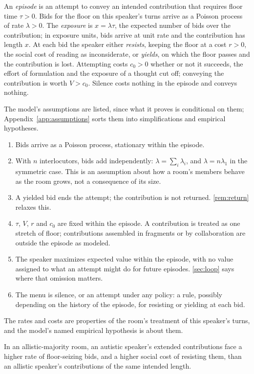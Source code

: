 An \emph{episode} is an attempt to convey an intended contribution that requires floor time $\tau > 0$. Bids for the floor on this speaker's turns arrive as a Poisson process of rate $\lambda > 0$. The \emph{exposure} is $x = \lambda\tau$, the expected number of bids over the contribution; in exposure units, bids arrive at unit rate and the contribution has length $x$. At each bid the speaker either \emph{resists}, keeping the floor at a cost $r > 0$, the social cost of reading as inconsiderate, or \emph{yields}, on which the floor passes and the contribution is lost. Attempting costs $c_0 > 0$ whether or not it succeeds, the effort of formulation and the exposure of a thought cut off; conveying the contribution is worth $V > c_0$. Silence costs nothing in the episode and conveys nothing.

The model's assumptions are listed, since what it proves is conditional on them; Appendix~\ref{app:assumptions} sorts them into simplifications and empirical hypotheses.
\begin{enumerate}[label=(M\arabic*)]
\item Bids arrive as a Poisson process, stationary within the episode.
\item With $n$ interlocutors, bids add independently: $\lambda = \sum_i \lambda_i$, and $\lambda = n\lambda_1$ in the symmetric case. This is an assumption about how a room's members behave as the room grows, not a consequence of its size.
\item A yielded bid ends the attempt; the contribution is not returned. \autoref{rem:return} relaxes this.
\item $\tau$, $V$, $r$ and $c_0$ are fixed within the episode. A contribution is treated as one stretch of floor; contributions assembled in fragments or by collaboration are outside the episode as modeled.
\item The speaker maximizes expected value within the episode, with no value assigned to what an attempt might do for future episodes. \autoref{sec:loop} says where that omission matters.
\item The menu is silence, or an attempt under any policy: a rule, possibly depending on the history of the episode, for resisting or yielding at each bid.
\end{enumerate}

The rates and costs are properties of the room's treatment of this speaker's turns, and the model's named empirical hypothesis is about them.

\begin{assumption}\label{prem:asymmetry}
In an allistic-majority room, an autistic speaker's extended contributions face a higher rate of floor-seizing bids, and a higher social cost of resisting them, than an allistic speaker's contributions of the same intended length.
\end{assumption}

